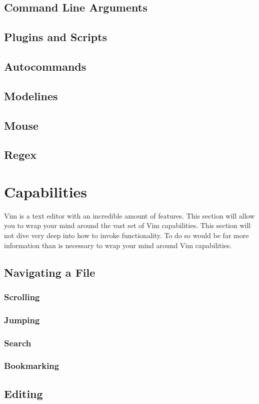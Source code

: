 \documentclass[12pt, oneside]{book}
\begin{document}
\section{Command Line Arguments}
\section{Plugins and Scripts}
\section{Autocommands}
\section{Modelines}
\section{Mouse}
\section{Regex}

\chapter{Capabilities}
Vim is a text editor with an incredible amount of features.  This section will allow you to wrap your mind around the vast set of Vim capabilities.  This section will not dive very deep into how to invoke
functionality.  To do so would be far more information than is necessary to wrap your mind around Vim capabilities.
\section{Navigating a File}
  \subsection{Scrolling}
  \subsection{Jumping}
  \subsection{Search}
  \subsection{Bookmarking}
\section{Editing}
\end{document}
